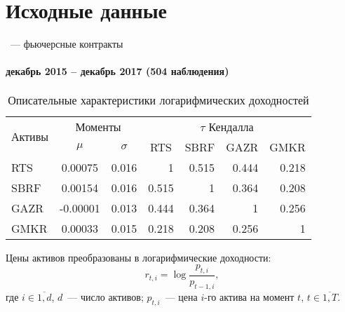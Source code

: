 \documentclass[aspectratio=169]{beamer}
\begin{document}
\section{Исходные данные}

\begin{frame}{{\insertsection}~--- фьючерсные контракты}
    \framesubtitle{декабрь 2015 -- декабрь 2017 (504 наблюдения)}
    \begin{table}
        \centering
        \caption{Описательные характеристики логарифмических доходностей}
        \begin{adjustbox}{max width=\textwidth}
        \begin{tabular}{l|cc|rrrr}
            \toprule
            \multirow{2}{*}{Активы} 
                & \multicolumn{2}{c|}{Моменты} 
                & \multicolumn{4}{c}{$\tau$ Кендалла} \\
            & $\mu$ & $\sigma$ & \multicolumn{1}{c}{RTS} & \multicolumn{1}{c}{SBRF} 
                & \multicolumn{1}{c}{GAZR} & \multicolumn{1}{c}{GMKR} \\ 
            \midrule
            RTS  &  0.00075 & 0.016 &     1 & 0.515 & 0.444 & 0.218 \\
            SBRF &  0.00154 & 0.016 & 0.515 &     1 & 0.364 & 0.208 \\
            GAZR & -0.00001 & 0.013 & 0.444 & 0.364 &     1 & 0.256 \\
            GMKR &  0.00033 & 0.015 & 0.218 & 0.208 & 0.256 &     1 \\    
            \bottomrule
        \end{tabular}
        \end{adjustbox}
    \end{table}
    Цены активов преобразованы в логарифмические доходности:
    \begin{equation}
        r_{t,i} = \log \frac{p_{t,i}}{p_{t-1,i}},
    \end{equation}
    где $i \in \overline{1, d}$, $d$~--- число активов; $p_{t, i}$~--- цена $i$-го актива на момент $t$, $t\in \overline{1, T}$.
\end{frame}

\end{document}
